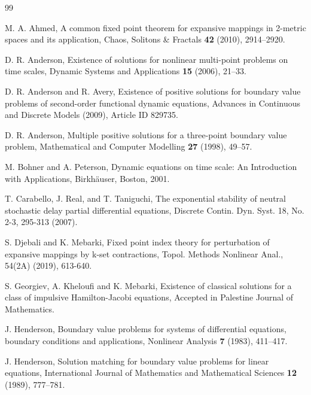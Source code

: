 \documentclass[reqno, 12pt]{amsart}
\numberwithin{equation}{section}
\begin{document}
\begin{thebibliography}{99}

 M. A. Ahmed, A common fixed point theorem for expansive mappings in 2-metric spaces and its application, Chaos, Solitons \& Fractals \textbf{42} (2010), 2914--2920.

 D. R. Anderson, Existence of solutions for nonlinear multi-point problems on time scales, Dynamic Systems and Applications \textbf{15} (2006), 21--33.

 D. R. Anderson and R. Avery, Existence of positive solutions for boundary value problems of second-order functional dynamic equations, Advances in Continuous and Discrete Models (2009), Article ID 829735.

 D. R. Anderson, Multiple positive solutions for a three-point boundary value problem, Mathematical and Computer Modelling \textbf{27} (1998), 49--57.


 M. Bohner and A. Peterson, Dynamic equations on time scale: An Introduction with Applications, Birkhäuser, Boston, 2001.

 T. Carabello, J. Real, and T. Taniguchi, The exponential stability of neutral stochastic delay partial differential equations, Discrete Contin. Dyn. Syst. 18, No. 2-3, 295-313 (2007).

 S. Djebali and K. Mebarki, Fixed point index theory for perturbation of expansive mappings by k-set contractions, Topol. Methods Nonlinear Anal., 54(2A) (2019), 613-640.

 S. Georgiev, A. Kheloufi and K. Mebarki, Existence of classical solutions for a class of impulsive Hamilton-Jacobi equations, Accepted in Palestine Journal of Mathematics.


 J. Henderson, Boundary value problems for systems of differential equations, boundary conditions and applications, Nonlinear Analysis \textbf{7} (1983), 411--417.

 J. Henderson, Solution matching for boundary value problems for linear equations, International Journal of Mathematics and Mathematical Sciences \textbf{12} (1989), 777--781.


\end{thebibliography}
\end{document}
